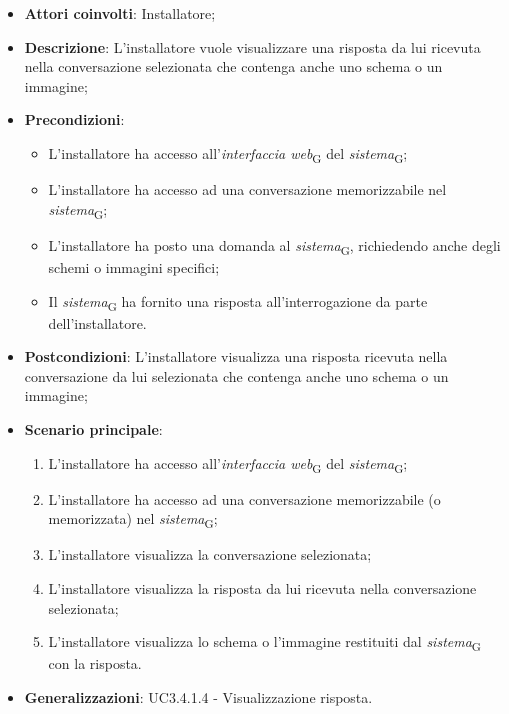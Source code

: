 \begin{itemize}
    \item \textbf{Attori coinvolti}: Installatore;
    \item \textbf{Descrizione}: L'installatore vuole visualizzare una  risposta da lui ricevuta nella conversazione selezionata che contenga anche uno schema o un immagine;
    \item \textbf{Precondizioni}: 
    \begin{itemize}
        \item L’installatore ha accesso all’\textit{interfaccia web}\textsubscript{G} del \textit{sistema}\textsubscript{G};
        \item L’installatore ha accesso ad una conversazione memorizzabile nel \textit{sistema}\textsubscript{G};
        \item L'installatore ha posto una domanda al \textit{sistema}\textsubscript{G}, richiedendo anche degli schemi o immagini specifici;
        \item Il \textit{sistema}\textsubscript{G} ha fornito una risposta all’interrogazione da parte dell’installatore.
    \end{itemize}
    \item \textbf{Postcondizioni}: L'installatore visualizza una risposta ricevuta nella conversazione da lui selezionata che contenga anche uno schema o un immagine;
    \item \textbf{Scenario principale}:
    \begin{enumerate}
        \item L’installatore ha accesso all’\textit{interfaccia web}\textsubscript{G} del \textit{sistema}\textsubscript{G};
        \item L’installatore ha accesso ad una conversazione memorizzabile (o memorizzata) nel \textit{sistema}\textsubscript{G};
        \item L'installatore visualizza la conversazione selezionata;
        \item L'installatore visualizza la risposta da lui ricevuta nella conversazione selezionata;
        \item L'installatore visualizza lo schema o l'immagine restituiti dal \textit{sistema}\textsubscript{G} con la risposta.
    \end{enumerate}
    \item \textbf{Generalizzazioni}: UC3.4.1.4 - Visualizzazione risposta.
\end{itemize}

